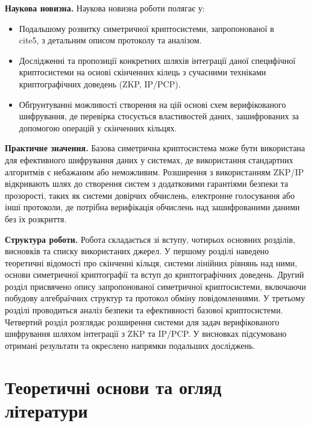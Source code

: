\documentclass[a4paper,12pt]{article}
\begin{document}
    \textbf{Наукова новизна.} Наукова новизна роботи полягає у:
    \begin{itemize}
        \item Подальшому розвитку симетричної криптосистеми, запропонованої в \\cite{5}, з детальним описом протоколу та аналізом.
        \item Дослідженні та пропозиції конкретних шляхів інтеграції даної специфічної криптосистеми на основі скінченних кілець з сучасними техніками криптографічних доведень (ZKP, IP/PCP).
        \item Обґрунтуванні можливості створення на цій основі схем верифікованого шифрування, де перевірка стосується властивостей даних, зашифрованих за допомогою операцій у скінченних кільцях.
    \end{itemize}

    \textbf{Практичне значення.} Базова симетрична криптосистема може бути використана для ефективного шифрування даних у системах, де використання стандартних алгоритмів є небажаним або неможливим. Розширення з використанням ZKP/IP відкривають шлях до створення систем з додатковими гарантіями безпеки та прозорості, таких як системи довірчих обчислень, електронне голосування або інші протоколи, де потрібна верифікація обчислень над зашифрованими даними без їх розкриття.

    \textbf{Структура роботи.} Робота складається зі вступу, чотирьох основних розділів, висновків та списку використаних джерел. У першому розділі наведено теоретичні відомості про скінченні кільця, системи лінійних рівнянь над ними, основи симетричної криптографії та вступ до криптографічних доведень. Другий розділ присвячено опису запропонованої симетричної криптосистеми, включаючи побудову алгебраїчних структур та протокол обміну повідомленнями. У третьому розділі проводиться аналіз безпеки та ефективності базової криптосистеми. Четвертий розділ розглядає розширення системи для задач верифікованого шифрування шляхом інтеграції з ZKP та IP/PCP. У висновках підсумовано отримані результати та окреслено напрямки подальших досліджень.

    \newpage


    \section{Теоретичні основи та огляд літератури} %
\end{document}
